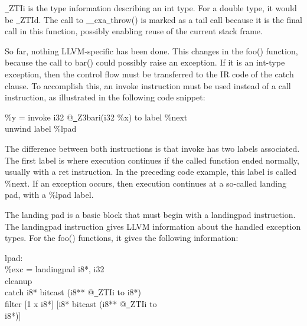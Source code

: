 \underline{~}ZTIi is the type information describing an int type. For a double type, it would be \underline{~}ZTId. The call to \underline{~~}cxa\underline{~}throw() is marked as a tail call because it is the final call in this function, possibly enabling reuse of the current stack frame.\par

So far, nothing LLVM-specific has been done. This changes in the foo() function, because the call to bar() could possibly raise an exception. If it is an int-type exception, then the control flow must be transferred to the IR code of the catch clause. To accomplish this, an invoke instruction must be used instead of a call instruction, as illustrated in the following code snippet:\par

\begin{tcolorbox}[colback=white,colframe=black]
\%y = invoke i32 @\underline{~}Z3bari(i32 \%x) to label \%next \\
\hspace*{6cm}unwind label \%lpad
\end{tcolorbox}

The difference between both instructions is that invoke has two labels associated. The first label is where execution continues if the called function ended normally, usually with a ret instruction. In the preceding code example, this label is called \%next. If an exception occurs, then execution continues at a so-called landing pad, with a \%lpad label.\par

The landing pad is a basic block that must begin with a landingpad instruction. The landingpad instruction gives LLVM information about the handled exception types. For the foo() functions, it gives the following information:\par

\begin{tcolorbox}[colback=white,colframe=black]
lpad: \\
\%exc = landingpad { i8*, i32 } \\
\hspace*{3cm}cleanup \\
\hspace*{3cm}catch i8* bitcast (i8** @\underline{~}ZTIi to i8*) \\
\hspace*{3cm}filter [1 x i8*] [i8* bitcast (i8** @\underline{~}ZTIi to  \\
\hspace*{3.5cm}i8*)]
\end{tcolorbox}

